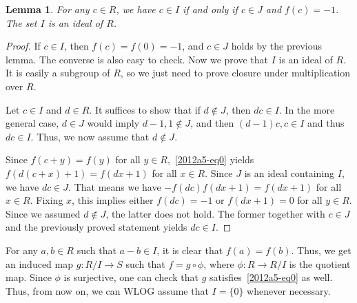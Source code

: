 \documentclass{article}
\newtheorem{lemma}{Lemma}
\begin{document}
\begin{lemma}\label{2012a5-2-2}
For any $c \in R$, we have $c \in I$ if and only if $c \in J$ and $f(c) = -1$.
The set $I$ is an ideal of $R$.
\end{lemma}
\begin{proof}
If $c \in I$, then $f(c) = f(0) = -1$, and $c \in J$ holds by the previous lemma.
The converse is also easy to check.
Now we prove that $I$ is an ideal of $R$.
It is easily a subgroup of $R$, so we just need to prove closure under multiplication over $R$.

Let $c \in I$ and $d \in R$.
It suffices to show that if $d \notin J$, then $dc \in I$.
In the more general case, $d \in J$ would imply $d - 1, 1 \notin J$, and then $(d - 1) c, c \in I$ and thus $dc \in I$.
Thus, we now assume that $d \notin J$.

Since $f(c + y) = f(y)$ for all $y \in R$,~\eqref{2012a5-eq0} yields $f(d(c + x) + 1) = f(dx + 1)$ for all $x \in R$.
Since $J$ is an ideal containing $I$, we have $dc \in J$.
That means we have $-f(dc) f(dx + 1) = f(dx + 1)$ for all $x \in R$.
Fixing $x$, this implies either $f(dc) = -1$ or $f(dx + 1) = 0$ for all $y \in R$.
Since we assumed $d \notin J$, the latter does not hold.
The former together with $c \in J$ and the previously proved statement yields $dc \in I$.
\end{proof}

For any $a, b \in R$ such that $a - b \in I$, it is clear that $f(a) = f(b)$.
Thus, we get an induced map $g : R/I \to S$ such that $f = g \circ \phi$, where $\phi : R \to R/I$ is the quotient map.
Since $\phi$ is surjective, one can check that $g$ satisfies~\eqref{2012a5-eq0} as well.
Thus, from now on, we can WLOG assume that $I = \{0\}$ whenever necessary.
\end{document}
